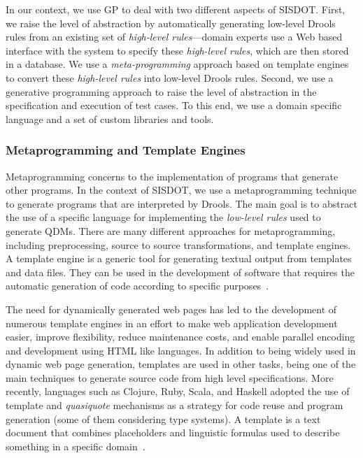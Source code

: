 \documentclass[AMA,STIX1COL]{WileyNJD-v2}
\newcommand{\callers}{\emph{high-level rules}\xspace}
\begin{document}
In our context, we use GP to deal with two different aspects of SISDOT. First, we raise the level of abstraction by automatically generating low-level Drools rules from an existing set of \callers{\color{blue}---domain experts use a Web based interface with the system to specify these \callers, which are then stored in a database.} We use a \emph{meta-programming} approach based on template engines to convert these \callers into low-level Drools rules. Second, we use a generative programming approach to raise the level of abstraction in the specification and execution of test cases. To this end, we use a domain specific language and a set of
custom libraries and tools.  


\subsubsection{Metaprogramming and Template Engines}

Metaprogramming concerns to the implementation of programs that generate other programs. In the context of SISDOT, we use a metaprogramming technique to generate programs that are interpreted by Drools. The main goal is to abstract the use of a specific language for implementing the \emph{low-level rules} used to generate QDMs. There are many different approaches for metaprogramming, including preprocessing, source to source transformations, and template engines. A template engine is a generic tool for generating textual output from templates and data files. They can be used in the development of software that requires the automatic generation of code according to specific purposes~\cite{benato2017}. 

The need for dynamically generated web pages has led to the development of numerous template engines in an effort to make web application development easier, improve flexibility, reduce maintenance costs, and enable parallel encoding and development using HTML like languages. In addition to being widely used in dynamic web page generation, templates are used in other tasks, being one of the main techniques to generate source code from high level specifications. More recently, languages such as Clojure, Ruby, Scala, and Haskell adopted the use of template and \emph{quasiquote} mechanisms as a strategy for code reuse and program generation (some of them considering type systems). A template is a text document that combines placeholders and linguistic formulas used to describe something in a specific domain~\cite{segura2017}. 
\end{document}
